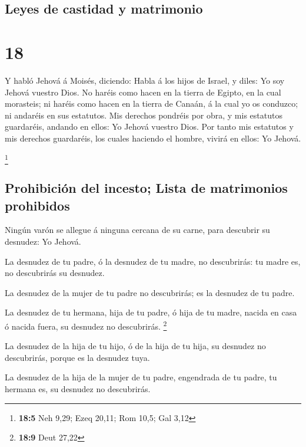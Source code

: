 \hypertarget{leyes-de-castidad-y-matrimonio}{%
\subsection{Leyes de castidad y
matrimonio}\label{leyes-de-castidad-y-matrimonio}}

\hypertarget{section-17}{%
\section{18}\label{section-17}}

 Y habló Jehová á Moisés, diciendo:  Habla á los
hijos de Israel, y diles: Yo soy Jehová vuestro Dios.  No
haréis como hacen en la tierra de Egipto, en la cual morasteis; ni
haréis como hacen en la tierra de Canaán, á la cual yo os conduzco; ni
andaréis en sus estatutos.  Mis derechos pondréis por obra,
y mis estatutos guardaréis, andando en ellos: Yo Jehová vuestro Dios.
 Por tanto mis estatutos y mis derechos guardaréis, los
cuales haciendo el hombre, vivirá en ellos: Yo Jehová.

\footnote{\textbf{18:5} Neh 9,29; Ezeq 20,11; Rom 10,5; Gal 3,12}

\hypertarget{prohibiciuxf3n-del-incesto-lista-de-matrimonios-prohibidos}{%
\subsection{Prohibición del incesto; Lista de matrimonios
prohibidos}\label{prohibiciuxf3n-del-incesto-lista-de-matrimonios-prohibidos}}

 Ningún varón se allegue á ninguna cercana de su carne, para
descubrir su desnudez: Yo Jehová.

 La desnudez de tu padre, ó la desnudez de tu madre, no
descubrirás: tu madre es, no descubrirás su desnudez.

 La desnudez de la mujer de tu padre no descubrirás; es la
desnudez de tu padre.

 La desnudez de tu hermana, hija de tu padre, ó hija de tu
madre, nacida en casa ó nacida fuera, su desnudez no descubrirás.
\footnote{\textbf{18:9} Deut 27,22}

 La desnudez de la hija de tu hijo, ó de la hija de tu
hija, su desnudez no descubrirás, porque es la desnudez tuya.

 La desnudez de la hija de la mujer de tu padre, engendrada
de tu padre, tu hermana es, su desnudez no descubrirás.

